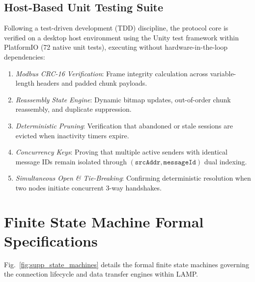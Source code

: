 \documentclass[journal]{IEEEtran}
\begin{document}
\subsection{Host-Based Unit Testing Suite}
Following a test-driven development (TDD) discipline, the protocol core is verified on a desktop host environment using the Unity test framework within PlatformIO (72 native unit tests), executing without hardware-in-the-loop dependencies:
\begin{enumerate}
  \item \textit{Modbus CRC-16 Verification}: Frame integrity calculation across variable-length headers and padded chunk payloads.
  \item \textit{Reassembly State Engine}: Dynamic bitmap updates, out-of-order chunk reassembly, and duplicate suppression.
  \item \textit{Deterministic Pruning}: Verification that abandoned or stale sessions are evicted when inactivity timers expire.
  \item \textit{Concurrency Keys}: Proving that multiple active senders with identical message IDs remain isolated through $(\mathtt{srcAddr}, \mathtt{messageId})$ dual indexing.
  \item \textit{Simultaneous Open \& Tie-Breaking}: Confirming deterministic resolution when two nodes initiate concurrent 3-way handshakes.
\end{enumerate}

\section{Finite State Machine Formal Specifications}
\label{sec:supp_fsm}

Fig.~\ref{fig:supp_state_machines} details the formal finite state machines governing the connection lifecycle and data transfer engines within LAMP.
\end{document}
